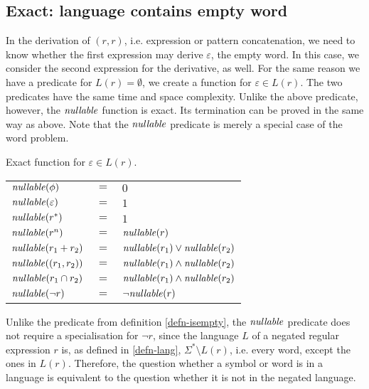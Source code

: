 \subsection{Exact: language contains empty word}

In the derivation of $(r,r)$, i.e. expression or pattern concatenation, we need
to know whether the first expression may derive $\varepsilon$, the empty word.
In this case, we consider the second expression for the derivative, as well. For
the same reason we have a predicate for $L(r) = \emptyset$, we create a function
for $\varepsilon \in L(r)$. The two predicates have the same time and space
complexity. Unlike the above predicate, however, the $\mathit{nullable}$ function is
exact. Its termination can be proved in the same way as above. Note that the
$\mathit{nullable}$ predicate is merely a special case of the word problem.

\begin{defn}[Nullability]
   \label{defn-nullable}
   Exact function for $\varepsilon \in L(r)$.

   \begin{tabular}{lll}
      $\mathit{nullable}(\phi)$		& $=$ & $0$ \\
      $\mathit{nullable}(\varepsilon)$	& $=$ & $1$ \\
      $\mathit{nullable}(r^*)$		& $=$ & $1$ \\
      $\mathit{nullable}(r^n)$		& $=$ & $\mathit{nullable}(r)$ \\
      $\mathit{nullable}(r_1 + r_2)$	& $=$ & $\mathit{nullable}(r_1) \vee \mathit{nullable}(r_2)$ \\
      $\mathit{nullable}((r_1, r_2))$	& $=$ & $\mathit{nullable}(r_1) \wedge \mathit{nullable}(r_2)$ \\
      $\mathit{nullable}(r_1 \cap r_2)$	& $=$ & $\mathit{nullable}(r_1) \wedge \mathit{nullable}(r_2)$ \\
      $\mathit{nullable}(\neg r)$	& $=$ & $\neg\mathit{nullable}(r)$ \\
   \end{tabular}

\end{defn}

Unlike the predicate from definition \ref{defn-isempty}, the $\mathit{nullable}$
predicate does not require a specialisation for $\neg r$, since the language $L$
of a negated regular expression $r$ is, as defined in \ref{defn-lang}, $\Sigma^*
\setminus L(r)$, i.e. every word, except the ones in $L(r)$. Therefore, the
question whether a symbol or word is in a language is equivalent to the question
whether it is not in the negated language.


